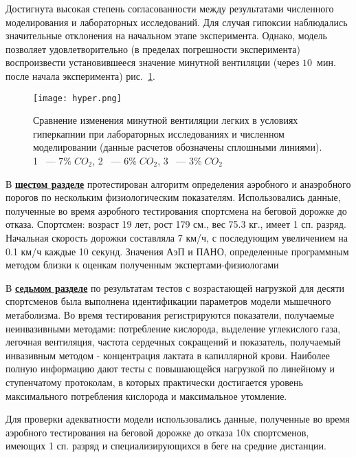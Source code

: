 Достигнута высокая степень согласованности между результатами численного моделирования и лабораторных исследований. Для случая гипоксии наблюдались значительные отклонения на начальном этапе эксперимента. Однако, модель позволяет удовлетворительно (в пределах погрешности эксперимента) воспроизвести установившееся значение минутной вентиляции (через $10$~мин. после начала эксперимента) рис.~\ref{image9}.
\begin{figure}[!ht]
    \centering
	\texttt{[image: hyper.png]}
	\caption{Сравнение изменения минутной вентиляции легких в условиях гиперкапнии при лабораторных исследованиях и численном моделировании (данные расчетов обозначены сплошными линиями). 1 ~--- \(7\% \;CO_{2}\), 2 ~--- \(6\% \;CO_{2}\), 3 ~--- \(3\% \;CO_{2}\) } 
	\label{image9}
\end{figure}

В \underline{\textbf{шестом разделе}} протестирован алгоритм определения аэробного и анаэробного порогов по нескольким физиологическим показателям. Использовались данные, полученные во время аэробного тестирования спортсмена на беговой дорожке до отказа. Спортсмен: возраст 19 лет, рост 179 см., вес 75.3 кг., имеет 1 сп. разряд. Начальная скорость дорожки составляла 7 км/ч, с последующим увеличением на 0.1 км/ч каждые 10 секунд.
Значения АэП и ПАНО, определенные программным методом близки к оценкам полученным экспертами-физиологами

В \underline{\textbf{седьмом разделе}} по результатам тестов с возрастающей нагрузкой для десяти спортсменов была выполнена идентификации параметров модели мышечного метаболизма. Во время тестирования регистрируются показатели, получаемые неинвазивными методами: потребление кислорода, выделение углекислого газа, легочная вентиляция, частота сердечных сокращений и показатель, получаемый инвазивным методом - концентрация лактата в капиллярной крови. Наиболее полную информацию дают тесты с повышающейся нагрузкой по линейному и ступенчатому протоколам, в которых практически достигается уровень максимального потребления кислорода и максимальное утомление.

Для проверки адекватности модели использовались данные, полученные во время аэробного тестирования на беговой дорожке до отказа 10х спортсменов, имеющих 1 сп. разряд и специализирующихся в беге на средние дистанции. 


